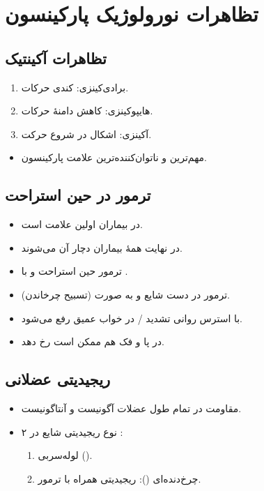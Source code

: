 \documentclass[a4paper,12pt]{extbook}
\begin{document}
\section*{تظاهرات نورولوژیک پارکینسون}
\subsection*{تظاهرات آکینتیک}
\begin{enumerate}[label=\alph*)]
\item برادی‌کینزی: کندی حرکات.
\item هایپوکینزی: کاهش دامنهٔ حرکات.
\item آکینزی: اشکال در شروع حرکت.
\end{enumerate}
\begin{itemize}
\item مهم‌ترین و ناتوان‌کننده‌ترین علامت پارکینسون.
\end{itemize}
\subsection*{ترمور در حین استراحت}
\begin{itemize}
\item در  بیماران اولین علامت است.
\item در نهایت همهٔ بیماران دچار آن می‌شوند.
\item ترمور حین استراحت و با .
\item ترمور در دست شایع و به صورت  (تسبیح چرخاندن).
\item با استرس روانی تشدید / در خواب عمیق رفع می‌شود.
\item در پا و فک هم ممکن است رخ دهد.
\end{itemize}
\subsection*{ریجیدیتی عضلانی}
\begin{itemize}
\item مقاومت در تمام طول  عضلات آگونیست و آنتاگونیست.
\item ۲ نوع ریجیدیتی شایع در :
\begin{enumerate}[label=\alph*)]
\item لوله‌سربی ().
\item چرخ‌دنده‌ای (): ریجیدیتی همراه با ترمور.
\end{enumerate}
\end{itemize}
\end{document}
